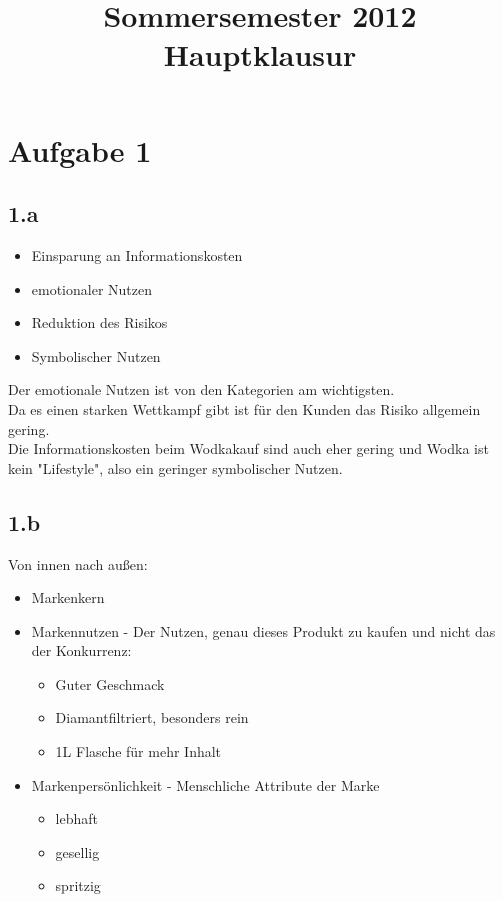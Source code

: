 

\title{Sommersemester 2012 Hauptklausur}
\maketitle

\section{Aufgabe 1}
\subsection{1.a}
    \begin{itemize}
        \item Einsparung an Informationskosten
        \item emotionaler Nutzen
        \item Reduktion des Risikos
        \item Symbolischer Nutzen
    \end{itemize}

    Der emotionale Nutzen ist von den Kategorien am wichtigsten. \\
    Da es einen starken Wettkampf gibt ist für den Kunden das Risiko allgemein gering. \\
    Die Informationskosten beim Wodkakauf sind auch eher gering und Wodka ist kein "Lifestyle", also ein geringer symbolischer Nutzen.
\subsection{1.b}
Von innen nach außen:
    \begin{itemize}
        \item Markenkern
        \item Markennutzen - Der Nutzen, genau dieses Produkt zu kaufen und nicht das der Konkurrenz:
        \begin{itemize}
            \item Guter Geschmack
            \item Diamantfiltriert, besonders rein
            \item 1L Flasche für mehr Inhalt
        \end{itemize}
        \item Markenpersönlichkeit - Menschliche Attribute der Marke
        \begin{itemize}
            \item lebhaft
            \item gesellig
            \item spritzig
        \end{itemize}
    \end{itemize}
